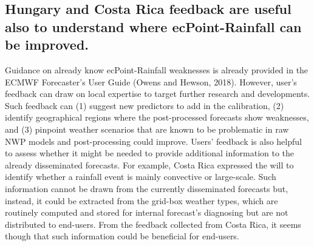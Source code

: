 \documentclass[twocol]{ametsocV5} %
\begin{document}
\subsection{Hungary and Costa Rica feedback are useful also to understand where ecPoint-Rainfall can be improved.}
    Guidance on already know ecPoint-Rainfall weaknesses is already provided in the ECMWF Forecaster’s User Guide (Owens and Hewson, 2018). However, user’s feedback can draw on local expertise to target further research and developments. Such feedback can (1) suggest new predictors to add in the calibration, (2) identify geographical regions where the post-processed forecasts show weaknesses, and (3) pinpoint weather scenarios that are known to be problematic in raw NWP models and post-processing could improve. Users’ feedback is also helpful to assess whether it might be needed to provide additional information to the already disseminated forecasts. For example, Costa Rica expressed the will to identify whether a rainfall event is mainly convective or large-scale. Such information cannot be drawn from the currently disseminated forecasts but, instead, it could be extracted from the grid-box weather types, which are routinely computed and stored for internal forecast’s diagnosing but are not distributed to end-users. From the feedback collected from Costa Rica, it seems though that such information could be beneficial for end-users. 
    
\end{document}
